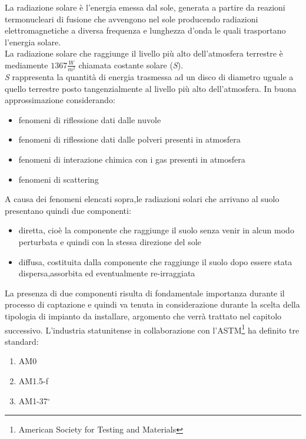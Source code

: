 La radiazione solare è l'energia emessa dal sole, generata a partire da reazioni termonucleari di fusione che avvengono nel sole producendo radiazioni elettromagnetiche a diversa frequenza e lunghezza d'onda le quali trasportano l'energia solare.\\
La radiazione solare che raggiunge il livello più alto dell'atmosfera terrestre è mediamente \(1367\frac{W}{m^2}\) chiamata costante solare (\textit{S}).\\
\textit{S} rappresenta la quantità di energia trasmessa ad un disco di diametro uguale a quello terrestre posto tangenzialmente al livello più alto dell'atmosfera.
\newpage\noindent
In buona approssimazione considerando\cite{captazione-enegia-solare}:
\begin{itemize}
    \item fenomeni di riflessione dati dalle nuvole
    \item fenomeni di riflessione dati dalle polveri presenti in atmosfera
    \item fenomeni di interazione chimica con i gas presenti in atmosfera
    \item fenomeni di scattering
\end{itemize}
A causa dei fenomeni elencati sopra,le radiazioni solari che arrivano al suolo presentano quindi due componenti:
\begin{itemize}
    \item diretta, cioè la componente che raggiunge il suolo senza venir in alcun modo perturbata e quindi con la stessa direzione del sole
    \item diffusa, costituita dalla componente che raggiunge il suolo dopo essere stata dispersa,assorbita ed eventualmente re-irraggiata
\end{itemize}
La presenza di due componenti risulta di fondamentale importanza durante il processo di captazione e quindi va tenuta in considerazione durante la scelta della tipologia di impianto da installare, argomento che verrà trattato nel capitolo successivo.
L'industria statunitense in collaborazione con l'ASTM\footnote{American Society for Testing and Materials} ha definito tre standard:
\begin{enumerate}
    \item AM0
    \item AM1.5-f
    \item AM1-37$^\circ$
\end{enumerate}
